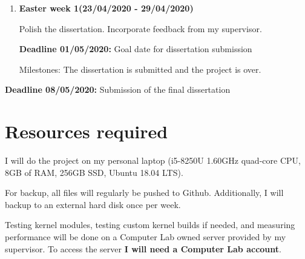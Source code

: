 \begin{enumerate}
            {\bf Deadline 12/04/2020:} Send the first draft to my supervisor

            Incorporate feedback from my supervisor.

            {\bf Deadline 22/04/2020:} Send the final draft to my supervisor

            Milestones: The dissertation is complete and has already gone through one revision.

        \item {\bf Easter week 1(23/04/2020 - 29/04/2020)} 

            Polish the dissertation. Incorporate feedback from my supervisor.

            {\bf Deadline 01/05/2020:} Goal date for dissertation submission

            Milestones: The dissertation is submitted and the project is over.

    \end{enumerate}
    {\bf Deadline 08/05/2020:} Submission of the final dissertation

\section*{Resources required}

    I will do the project on my personal laptop (i5-8250U 1.60GHz quad-core CPU, 8GB of RAM, 256GB SSD, Ubuntu 18.04 LTS).
    
    For backup, all files will regularly be pushed to Github. Additionally, I will backup to an external hard disk
    once per week.

    Testing kernel modules, testing custom kernel builds if needed, and measuring performance will be done on 
    a Computer Lab owned server provided by my supervisor. To access the server {\bf I will need a Computer Lab account}.